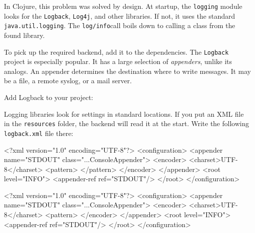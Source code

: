 
In Clojure, this problem was solved by design. At startup, the \verb|logging| module looks for the \verb|Logback|, \verb|Log4j|, and other libraries. If not, it uses the standard \verb|java.util.logging|. The \verb|log/info|call boils down to calling a class from the found library.

To pick up the required backend, add it to the dependencies. The \verb|Logback| project is especially popular. It has a large selection of \emph{appenders}, unlike its analogs. An appender determines the destination where to write messages. It may be a file, a remote syslog, or a mail server.

Add Logback to your project:

\begin{english}
  \begin{clojure}
  \end{clojure}
\end{english}


Logging libraries look for settings in standard locations. If you put an XML file in the \verb|resources| folder, the backend will read it at the start. Write the following \verb|logback.xml| file there:

\ifx\DEVICETYPE\MOBILE

\begin{english}
  \begin{xml}
<?xml version="1.0" encoding="UTF-8"?>
<configuration>
  <appender name="STDOUT"
    class="...ConsoleAppender">
    <encoder>
      <charset>UTF-8</charset>
      <pattern>
      </pattern>
    </encoder>
  </appender>
  <root level="INFO">
    <appender-ref ref="STDOUT"/>
  </root>
</configuration>
  \end{xml}
\end{english}

\else

\begin{english}
  \begin{xml}
<?xml version="1.0" encoding="UTF-8"?>
<configuration>
  <appender name="STDOUT" class="...ConsoleAppender">
    <encoder>
      <charset>UTF-8</charset>
      <pattern>%
    </encoder>
  </appender>
  <root level="INFO">
    <appender-ref ref="STDOUT"/>
  </root>
</configuration>
  \end{xml}
\end{english}

